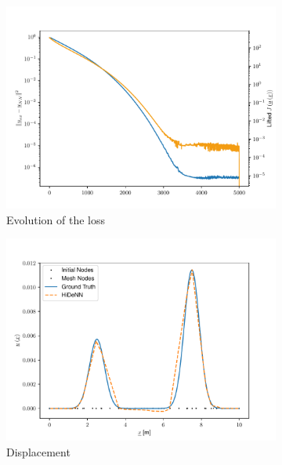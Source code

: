 \begin{figure}
    \begin{subfigure}{0.3\linewidth}
        \centering
        \includegraphics[width=\linewidth]{Figures/Loss_Comaprison_Regul64.pdf}
        \caption{Evolution of the loss}
    \end{subfigure}
    \begin{subfigure}{0.3\linewidth}
        \centering
        \includegraphics[width=\linewidth]{Figures/Solution_displacement_Regul64.pdf}
        \caption{Displacement}
    \end{subfigure}
    \begin{subfigure}{0.3\linewidth}
        \centering

\end{subfigure}
\end{figure}
